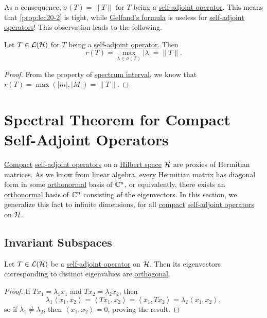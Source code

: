 As a consequence, \(\sigma (T) = \lVert T \rVert \) for \(T\) being a \hyperref[def:self-adjoint-op]{self-adjoint operator}. This means that \autoref{prop:lec20-2} is tight, while \hyperref[thm:Gelfand-formula]{Gelfand's formula} is useless for \hyperref[def:self-adjoint-op]{self-adjoint operators}! This observation leads to the following.

\begin{corollary}\label{col:spectral-radius}
	Let \(T\in \mathcal{\MakeUppercase{l}} (\mathcal{\MakeUppercase{h}} )\) for \(T\) being a \hyperref[def:self-adjoint-op]{self-adjoint operator}. Then
	\[
		r(T) = \max _{\lambda \in \sigma (T)} \vert \lambda \vert = \lVert T \rVert.
	\]
\end{corollary}
\begin{proof}
	From the property of \hyperref[thm:spectrum-interval]{spectrum interval}, we know that \(r(T) = \max (\vert m \vert , \vert M \vert ) = \lVert T \rVert\).
\end{proof}

\section{Spectral Theorem for Compact Self-Adjoint Operators}
\hyperref[def:compact-op]{Compact} \hyperref[def:self-adjoint-op]{self-adjoint operators} on a \hyperref[def:Hilbert-space]{Hilbert space} \(\mathcal{\MakeUppercase{h}} \) are proxies of Hermitian matrices. As we know from linear algebra, every Hermitian matrix has diagonal form in some \hyperref[def:orthonormal-system]{orthonormal} basis of \(\mathbb{\MakeUppercase{c}} ^n\), or equivalently, there exists an \hyperref[def:orthonormal-system]{orthonormal} basis of \(\mathbb{\MakeUppercase{c}} ^n\) consisting of the eigenvectors. In this section, we generalize this fact to infinite dimensions, for all \hyperref[def:compact-op]{compact} \hyperref[def:self-adjoint-op]{self-adjoint operators} on \(\mathcal{\MakeUppercase{h}} \).

\subsection{Invariant Subspaces}
\begin{proposition}\label{prop:eigenvectors-orthogonal}
	Let \(T\in \mathcal{\MakeUppercase{l}} (\mathcal{\MakeUppercase{h}} )\) be a \hyperref[def:self-adjoint-op]{self-adjoint operator} on \(\mathcal{\MakeUppercase{h}} \). Then its eigenvectors corresponding to distinct eigenvalues are \hyperref[def:orthogonal-dsystem]{orthogonal}.
\end{proposition}
\begin{proof}
	If \(Tx_1 = \lambda _1 x_1\) and \(Tx_2 = \lambda _2 x_2\), then
	\[
		\lambda _1 \left\langle x_1, x_2 \right\rangle
		= \left\langle Tx_1, x_2 \right\rangle
		= \left\langle x_1, Tx_2 \right\rangle
		= \lambda _2 \left\langle x_1, x_2 \right\rangle,
	\]
	so if \(\lambda _1 \neq \lambda _2\), then \(\left\langle x_1, x_2 \right\rangle = 0\), proving the result.
\end{proof}

